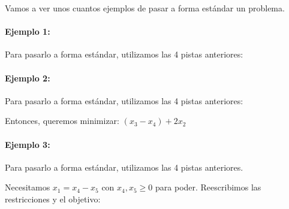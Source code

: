 \begin{example} Vamos a ver unos cuantos ejemplos de pasar a forma estándar un problema.

\paragraph{Ejemplo 1:}

\begin{ioprob}
\end{ioprob}


Para pasarlo a forma estándar, utilizamos las 4 pistas anteriores:

\begin{ioprob}
\end{ioprob}



\paragraph{Ejemplo 2:} 

\begin{ioprob}
\end{ioprob}

Para pasarlo a forma estándar, utilizamos las 4 pistas anteriores:

\begin{ioprob}
\end{ioprob}

Entonces, queremos minimizar: $(x_3 - x_4) + 2x_2$

\begin{ioprob}
\end{ioprob}

\paragraph{Ejemplo 3:}

\begin{ioprob}
\end{ioprob}

Para pasarlo a forma estándar, utilizamos las 4 pistas anteriores. 

Necesitamos $x_1 = x_4 - x_5$ con $x_4,x_5\geq 0$ para poder. Reescribimos las restricciones y el objetivo:

\begin{ioprob}
\end{ioprob}

\end{example}
